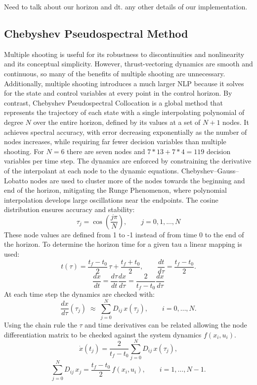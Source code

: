 \documentclass[]{article}
\begin{document}
Need to talk about our horizon and dt. any other details of our implementation.

\subsection*{Chebyshev Pseudospectral Method}
Multiple shooting is useful for its robustness to discontinuities and nonlinearity and its conceptual simplicity. However, thrust-vectoring dynamics are smooth and continuous, so many of the benefits of multiple shooting are unnecessary. Additionally, multiple shooting introduces a much larger NLP because it solves for the state and control variables at every point in the control horizon. By contrast, Chebyshev Pseudospectral Collocation is a global method that represents the trajectory of each state with a single interpolating polynomial of degree $N$ over the entire horizon, defined by its values at a set of $N+1$ nodes. It achieves spectral accuracy, with error decreasing exponentially as the number of nodes increases, while requiring far fewer decision variables than multiple shooting. For $N=6$ there are seven nodes and $7*13+7*4=119$ decision variables per time step. The dynamics are enforced by constraining the derivative of the interpolant at each node to the dynamic equations. Chebyshev–Gauss–Lobatto nodes are used to cluster more of the nodes towards the beginning and end of the horizon, mitigating the Runge Phenomenon, where polynomial interpolation develops large oscillations near the endpoints. The cosine distribution ensures accuracy and stability:
	\[
        \tau_j = \cos{(\frac{j\pi}{N})},\qquad j = 0,1,...,N
        \]
 These node values are defined from 1 to -1 instead of from time 0 to the end of the horizon. To determine the horizon time for a given tau a linear mapping is used:
         \[
        t(\tau) = \frac{t_f-t_0}{2}\,\tau + \frac{t_f+t_0}{2}, 
        \qquad 
        \frac{dt}{d\tau} = \frac{t_f-t_0}{2}.
        \]
        \[
        \frac{dx}{dt}=\frac{d\tau}{dt}\frac{dx}{d\tau}=\frac{2}{t_f-t_0}\frac{dx}{d\tau}
        \]
At each time step the dynamics are checked with:
        \[
        \frac{dx}{d\tau}(\tau_j) \;\approx\; \sum_{j=0}^N D_{ij}\,x(\tau_j), 
        \qquad i=0,\dots,N.
        \]
Using the chain rule the $\tau$ and time derivatives can be related allowing the node differentiation matrix to be checked against the system dynamics $f(x_i,u_i)$.
        \[
       \dot{x}(t_j)= \frac{2}{t_f-t_0}\sum_{j=0}^N D_{ij}\,x(\tau_j), 
        \]
        \[
        \sum_{j=0}^N D_{ij}\,x_j 
        = \frac{t_f-t_0}{2}\, f(x_i,u_i), 
        \qquad i=1,\dots,N-1.
        \]
\end{document}
